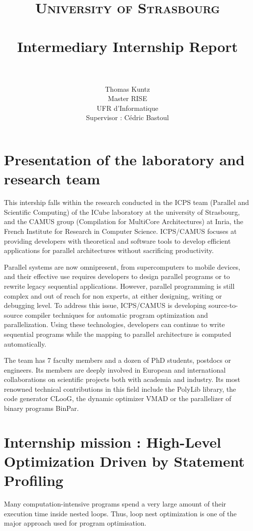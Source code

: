 \documentclass[paper=a4, fontsize=11pt]{scrartcl}
\title{
        \usefont{OT1}{bch}{b}{n}
        \normalfont \normalsize \textsc{University of Strasbourg} \\ [25pt]
        \horrule{0.5pt} \\[0.4cm]
        \huge Intermediary Internship Report \\
        \horrule{2pt} \\[0.5cm]
}
\author{
        \normalfont                                 \normalsize
        Thomas Kuntz \\                                \normalsize
        Master RISE \\                                \normalsize
        UFR d'Informatique \\                                \normalsize
        Supervisor : Cédric Bastoul\\
}
\date{}
\numberwithin{equation}{section}        %
\numberwithin{figure}{section}          %
\numberwithin{table}{section}               %
\begin{document}
\maketitle
\thispagestyle{empty}

\clearpage

\tableofcontents
\clearpage

\section{Presentation of the laboratory and research team}
This intership falls within the research conducted in the ICPS team (Parallel and Scientific
Computing) of the ICube laboratory at the university of Strasbourg, and the CAMUS group
(Compilation for MultiCore Architectures) at Inria, the French Institute for Research
in Computer Science. ICPS/CAMUS focuses at providing developers with theoretical and software
tools to develop efficient applications for parallel architectures without sacrificing
productivity.

Parallel systems are now omnipresent, from supercomputers to mobile devices,
and their effective use requires developers to design parallel programs or to rewrite
legacy sequential applications. However, parallel programming is still complex and out
of reach for non experts, at either designing, writing or debugging level. To address
this issue, ICPS/CAMUS is developing source-to-source compiler techniques for automatic
program optimization and parallelization. Using these technologies, developers can
continue to write sequential programs while the mapping to parallel architecture is
computed automatically.

The team has 7 faculty members and a dozen of PhD students,
postdocs or engineers. Its members are deeply involved in European and international
collaborations on scientific projects both with academia and industry.
Its most renowned technical contributions in this field include
the PolyLib library, the code generator CLooG, the dynamic optimizer VMAD or the parallelizer
of binary programs BinPar.

\section{Internship mission : High-Level Optimization Driven by Statement Profiling}
Many computation-intensive programs spend a very large amount of their execution
time inside nested loops. Thus, loop nest optimization is one of the major approach used
for program optimisation.
\end{document}
